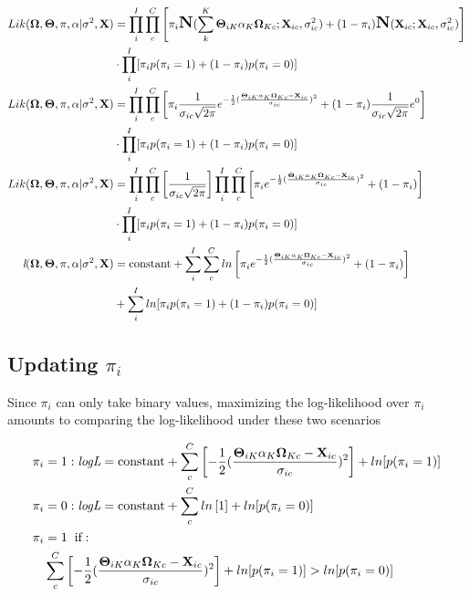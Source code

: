 \documentclass[12pt]{article}
\begin{document}
\begin{align}
Lik(\mathbf{\Omega}, \mathbf{\Theta}, \pi, \alpha | \sigma^{2}, \textbf{X}) &= \prod_{i}^{I}\prod_{c}^{C}\left[ \pi_{i}\mbox{\Large \textbf{N}}(\sum_{k}^{K}\mathbf{\Theta}_{iK}\alpha_{K}\mathbf{\Omega}_{Kc} ; \textbf{X}_{ic}, \sigma^{2}_{ic}) + (1-\pi_{i})\mbox{\Large \textbf{N}}( \textbf{X}_{ic}; \textbf{X}_{ic}, \sigma^{2}_{ic}) \right] \notag\\
&\cdot \prod_{i}^{I}[\pi_{i}p(\pi_{i} = 1) + (1-\pi_{i})p(\pi_{i} = 0)]\notag\\
Lik(\mathbf{\Omega}, \mathbf{\Theta}, \pi, \alpha | \sigma^{2}, \textbf{X}) &= \prod_{i}^{I}\prod_{c}^{C}\left[\pi_{i}\frac{1}{\sigma_{ic}\sqrt{2\pi}}e^{-\frac{1}{2}(\frac{\mathbf{\Theta}_{iK}\alpha_{K}\mathbf{\Omega}_{Kc} - \textbf{X}_{ic}}{\sigma_{ic}})^2} + (1-\pi_{i})\frac{1}{\sigma_{ic}\sqrt{2\pi}}e^{0}\right]\notag\\
&\cdot \prod_{i}^{I}[\pi_{i}p(\pi_{i} = 1) + (1-\pi_{i})p(\pi_{i} = 0)]\notag\\
Lik(\mathbf{\Omega}, \mathbf{\Theta}, \pi, \alpha | \sigma^{2}, \textbf{X}) &= \prod_{i}^{I}\prod_{c}^{C}\left[\frac{1}{\sigma_{ic}\sqrt{2\pi}} \right] \prod_{i}^{I}\prod_{c}^{C}\left[\pi_{i}e^{-\frac{1}{2}(\frac{\mathbf{\Theta}_{iK}\alpha_{K}\mathbf{\Omega}_{Kc} - \textbf{X}_{ic}}{\sigma_{ic}})^2} + (1-\pi_{i})\right]\notag\\
&\cdot \prod_{i}^{I}[\pi_{i}p(\pi_{i} = 1) + (1-\pi_{i})p(\pi_{i} = 0)]\notag\\
\textit{l}(\mathbf{\Omega}, \mathbf{\Theta}, \pi, \alpha | \sigma^{2}, \textbf{X}) &= \text{constant} + \sum_{i}^{I}\sum_{c}^{C}ln\left[\pi_{i}e^{-\frac{1}{2}(\frac{\mathbf{\Theta}_{iK}\alpha_{K}\mathbf{\Omega}_{Kc} - \textbf{X}_{ic}}{\sigma_{ic}})^2} + (1-\pi_{i})\right]\notag\\
&+ \sum_{i}^{I}ln[\pi_{i}p(\pi_{i} = 1) + (1-\pi_{i})p(\pi_{i} = 0)]\notag\\
\end{align}

\subsection*{Updating $\pi_{i}$}

Since $\pi_{i}$ can only take binary values, maximizing the log-likelihood over $\pi_{i}$ amounts to comparing the log-likelihood under these two scenarios

\begin{align}
\pi_{i} &= 1: \textit{logL} = \text{constant} + \sum_{c}^{C}\left[{-\frac{1}{2}(\frac{\mathbf{\Theta}_{iK}\alpha_{K}\mathbf{\Omega}_{Kc} - \textbf{X}_{ic}}{\sigma_{ic}})^2}\right] + ln[p(\pi_{i} = 1)]\notag\\
\pi_{i} &= 0: \textit{logL} = \text{constant} + \sum_{c}^{C}ln\left[1\right] + ln[p(\pi_{i} = 0)]\notag\\
\pi_{i} &= 1 \hspace{2mm}\text{if}:\notag\\ & \sum_{c}^{C}\left[{-\frac{1}{2}(\frac{\mathbf{\Theta}_{iK}\alpha_{K}\mathbf{\Omega}_{Kc} - \textbf{X}_{ic}}{\sigma_{ic}})^2}\right] + ln[p(\pi_{i} = 1)] > ln[p(\pi_{i} = 0)]
\end{align}
\end{document}
